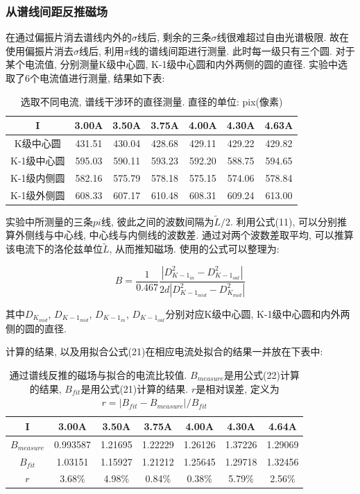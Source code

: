 \documentclass[12pt,a4paper]{article}
\newcommand{\be}[1]{
    \begin{equation}
        #1
    \end{equation}
}
\begin{document}
\subsubsection{从谱线间距反推磁场}
在通过偏振片消去谱线内外的$\sigma$线后, 剩余的三条$\sigma$线很难超过自由光谱极限. 故在使用偏振片消去$\sigma$线后, 利用$\pi$线的谱线间距进行测量. 
此时每一级只有三个圆. 对于某个电流值, 分别测量K级中心圆, K-1级中心圆和内外两侧的圆的直径. 
实验中选取了6个电流值进行测量, 结果如下表: 
\begin{table}[H]
    \centering
    \begin{tabular}{|c|c|c|c|c|c|c|}
    \hline
      I      & 3.00A   & 3.50A   & 3.75A  & 4.00A   & 4.30A   & 4.63A   \\ \hline
    K级中心圆   & 431.51 & 430.04 & 428.68 & 429.11 & 429.22 & 429.82 \\ \hline
    K-1级中心圆 & 595.03 & 590.11 & 593.23 & 592.20 & 588.75 & 594.65 \\ \hline
    K-1级内侧圆 & 582.16 & 575.79 & 578.18 & 575.15 & 574.06 & 578.84 \\ \hline
    K-1级外侧圆 & 608.33 & 607.17 & 610.48 & 608.31 & 609.24 & 613.00 \\ \hline
    \end{tabular}
    \caption{选取不同电流, 谱线干涉环的直径测量. 直径的单位: pix(像素)}
    \end{table}


实验中所测量的三条$pi$线, 彼此之间的波数间隔为$\widetilde{L}/2$. 利用公式(11), 可以分别推算外侧线与中心线, 中心线与内侧线的波数差. 通过对两个波数差取平均, 可以推算该电流下的洛伦兹单位$\widetilde{L}$, 
从而推知磁场. 
使用的公式可以整理为: 
\be{B=\frac{1}{0.467}\frac{\left |D_{K-1_{in}}^2-D_{K-1_{out}}^2\right |}{2d\left |D_{K-1_{mid}}^2-D_{K_{mid}}^2\right|}}

其中$D_{K_{mid}}$, $D_{K-1_{mid}}$, $D_{K-1_{in}}$, $D_{K-1_{out}}$分别对应K级中心圆, K-1级中心圆和内外两侧的圆的直径.

计算的结果, 以及用拟合公式(21)在相应电流处拟合的结果一并放在下表中: 
\begin{table}[H]
    \centering
    \begin{tabular}{|c|c|c|c|c|c|c|}
    \hline
    I&3.00A&3.50A&3.75A&4.00A&4.30A&4.64A\\ \hline
    $B_{measure}$ & 0.993587 & 1.21695 & 1.22229 & 1.26126 & 1.37226 & 1.29069 \\ \hline
    $B_{fit}$     & 1.03151  & 1.15927 & 1.21212 & 1.25645 & 1.29718 & 1.32456 \\ \hline
    $r$ &3.68\%	&4.98\%	&0.84\%&	0.38\%&	5.79\%&	2.56\%  \\ \hline

    \end{tabular}
    \caption{通过谱线反推的磁场与拟合的电流比较值. $B_{measure}$是用公式(22)计算的结果, $B_{fit}$是用公式(21)计算的结果. $r$是相对误差, 定义为$r=\left | B_{fit}-B_{measure}\right |/B_{fit}$}
    \end{table}
\end{document}
